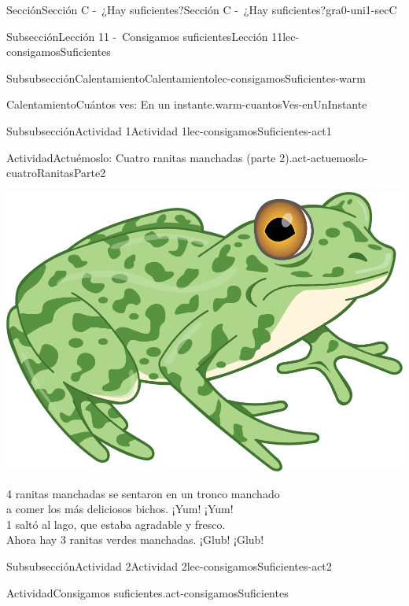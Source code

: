 \documentclass[twoside,10pt,]{article}
\begin{document}
\begin{sectionptx}{Sección}{Sección C -~¿Hay suficientes?}{}{Sección C -~¿Hay suficientes?}{}{}{gra0-uni1-secC}
\begin{subsectionptx}{Subsección}{Lección 11 -~Consigamos suficientes}{}{Lección 11}{}{}{lec-consigamosSuficientes}
\begin{subsubsectionptx}{Subsubsección}{Calentamiento}{}{Calentamiento}{}{}{lec-consigamosSuficientes-warm}
\begin{exploration}{Calentamiento}{Cuántos ves: En un instante.}{warm-cuantosVes-enUnInstante}
\begin{sidebyside}{2}{0}{0}{0}
\begin{sbspanel}{0.5}
\end{sbspanel}%
\end{sidebyside}%
\end{exploration}%
\end{subsubsectionptx}
%
%
\typeout{************************************************}
\typeout{************************************************}
%
\begin{subsubsectionptx}{Subsubsección}{Actividad 1}{}{Actividad 1}{}{}{lec-consigamosSuficientes-act1}
\begin{activity}{Actividad}{Actuémoslo: Cuatro ranitas manchadas (parte 2).}{act-actuemoslo-cuatroRanitasParte2}%
\begin{image}{0.275}{0.45}{0.275}{}%
\includegraphics[width=\linewidth]{external/png-source/RANA-VERDE.png}
\end{image}%
%
\par
4 ranitas manchadas se sentaron en un tronco manchado\\
 a comer los más deliciosos bichos. ¡Yum! ¡Yum!\\
 1 saltó al lago, que estaba agradable y fresco.\\
 Ahora hay 3 ranitas verdes manchadas. ¡Glub! ¡Glub!%
\end{activity}%
\end{subsubsectionptx}
%
%
\typeout{************************************************}
\typeout{************************************************}
%
\begin{subsubsectionptx}{Subsubsección}{Actividad 2}{}{Actividad 2}{}{}{lec-consigamosSuficientes-act2}
\begin{activity}{Actividad}{Consigamos suficientes.}{act-consigamosSuficientes}%

\end{activity}
\end{subsubsectionptx}
\end{subsectionptx}
\end{sectionptx}
\end{document}
